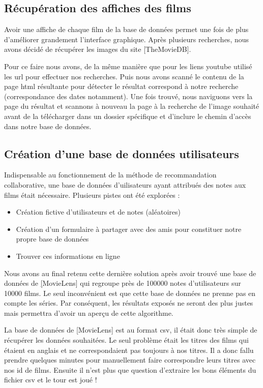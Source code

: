 \subsection{Récupération des affiches des films}
Avoir une affiche de chaque film de la base de données permet une fois de plus d'améliorer grandement l'interface graphique.
Après plusieurs recherches, nous avons décidé de récupérer les images du site \href{https://www.themoviedb.org}[TheMovieDB].\par
Pour ce faire nous avons, de la même manière que pour les liens youtube utilisé les url pour effectuer nos recherches. Puis nous avons scanné le contenu de la page html résultante pour détecter le résultat correspond à notre recherche (correspondance des dates notamment). Une fois trouvé, nous naviguons vers la page du résultat et scannons à nouveau la page à la recherche de l'image souhaité avant de la télécharger dans un dossier spécifique et d'inclure le chemin d'accès dans notre base de données.

\subsection{Création d'une base de données utilisateurs}
Indispensable au fonctionnement de la méthode de recommandation collaborative, une base de données d'uilisateurs ayant attribués des notes aux films était nécessaire. Plusieurs pistes ont été explorées :
\begin{itemize}
	\item Création fictive d'utilisateurs et de notes (aléatoires)
	\item Création d'un formulaire à partager avec des amis pour constituer notre propre base de données
	\item Trouver ces informations en ligne
\end{itemize}
Nous avons au final retenu cette dernière solution après avoir trouvé une base de données de \href{https://grouplens.org/datasets/movielens/}[MovieLens] qui regroupe près de 100000 notes d'utilisateurs sur 10000 films. Le seul inconvénient est que cette base de données ne prenne pas en compte les séries. Par conséquent, les résultats exposés ne seront des plus justes mais permettra d'avoir un aperçu de cette algorithme.\par
La base de données de \href{https://grouplens.org/datasets/movielens/}[MovieLens] est au format csv, il était donc très simple de récupérer les données souhaitées. Le seul problème était les titres des films qui étaient en anglais et ne correspondaient pas toujours à nos titres. Il a donc fallu prendre quelques minutes pour manuellement faire correspondre leurs titres avec nos id de films. Ensuite il n'est plus que question d'extraire les bons éléments du fichier csv et le tour est joué !
